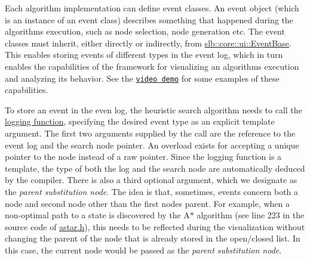 Each algorithm implementation can define event classes. An event object (which is an instance of an event class) describes something that happened during the algorithm\textquotesingle{}s execution, such as node selection, node generation etc. The event classes must inherit, either directly or indirectly, from \hyperlink{structslb_1_1core_1_1ui_1_1EventBase}{slb\+::core\+::ui\+::\+Event\+Base}. This enables storing events of different types in the event log, which in turn enables the capabilities of the framework for visualizing an algorithm\textquotesingle{}s execution and analyzing its behavior. See the \href{https://youtu.be/cElxLWve1Zw}{\tt video demo} for some examples of these capabilities.

To store an event in the even log, the heuristic search algorithm needs to call the \hyperlink{namespaceslb_1_1core_1_1ui_acdeb0db1847459cac6f4eeb22bbb5998}{logging function}, specifying the desired event type as an explicit template argument. The first two arguments supplied by the call are the reference to the event log and the search node pointer. An overload exists for accepting a unique pointer to the node instead of a raw pointer. Since the logging function is a template, the type of both the log and the search node are automatically deduced by the compiler. There is also a third optional argument, which we designate as the {\itshape parent substitution node}. The idea is that, sometimes, events concern both a node and second node other than the first node\textquotesingle{}s parent. For example, when a non-\/optimal path to a state is discovered by the A$\ast$ algorithm (see line 223 in the source code of \hyperlink{astar_8h}{astar.\+h}), this needs to be reflected during the visualization without changing the parent of the node that is already stored in the open/closed list. In this case, the current node would be passed as the {\itshape parent substitution node}.

